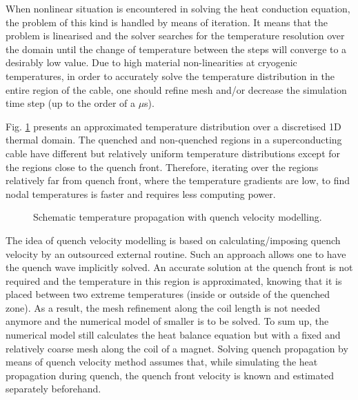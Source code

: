 
When nonlinear situation is encountered in solving the heat conduction equation, the problem of this kind is handled by means of iteration. It means that the problem is linearised and the solver searches for the temperature resolution over the domain until the change of temperature between the steps will converge to a desirably low value. Due to high material non-linearities at cryogenic temperatures, in order to accurately solve the temperature distribution in the entire region of the cable, one should refine mesh and/or decrease the simulation time step (up to the order of a $\mu$s).

Fig. \ref{fig:modelling_approach} presents an approximated temperature distribution over a discretised 1D thermal domain. The quenched and non-quenched regions in a superconducting cable have different but relatively uniform temperature distributions except for the regions close to the quench front. Therefore, iterating over the regions relatively far from quench front, where the temperature gradients are low, to find nodal temperatures is faster and requires less computing power.

\begin{figure}[H]
\centering
{}
\caption{Schematic temperature propagation with quench velocity modelling.}
\label{fig:modelling_approach}
\end{figure}

The idea of quench velocity modelling is based on calculating/imposing quench velocity by an outsourced external routine. Such an approach allows one to have the quench wave implicitly solved. An accurate solution at the quench front is not required and the temperature in this region is approximated, knowing that it is placed between two extreme temperatures (inside or outside of the quenched zone). As a result, the mesh refinement along the coil length is not needed anymore and the numerical model of smaller is to be solved. To sum up, the numerical model still calculates the heat balance equation but with a fixed and relatively coarse mesh along the coil of a magnet. Solving quench propagation by means of quench velocity method assumes that, while  simulating the heat propagation during quench, the quench front velocity is known and estimated separately beforehand. 